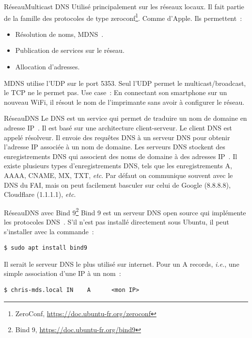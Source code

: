 \documentclass{beamer}
\begin{document}
    \begin{frame}{Réseau}{Multicast DNS}
        Utilisé principalement sur les réseaux locaux.
        Il fait partie de la famille des protocoles de type zeroconf\footnote{ZeroConf, \url{https://doc.ubuntu-fr.org/zeroconf}}.
        Comme  d'Apple.
        Ils permettent~:
        \begin{itemize}
            \item  Résolution de noms, MDNS~.
            \item  Publication de services sur le réseau.
            \item  Allocation d'adresses.
        \end{itemize}
        \bigbreak
        MDNS utilise l'UDP sur le port 5353.
        Seul l'UDP permet le multicast/broadcast, le TCP ne le permet pas.
        \bigbreak
        Use case~: En connectant son smartphone sur un nouveau WiFi, il résout le nom de l'imprimante sans avoir à configurer le réseau.
    \end{frame}

    \begin{frame}{Réseau}{DNS}
        Le DNS est un service qui permet de traduire un nom de domaine en adresse IP~.
        Il est basé sur une architecture client-serveur.
        \bigbreak
        Le client DNS est appelé résolveur.
        Il envoie des requêtes DNS à un serveur DNS pour obtenir l'adresse IP associée à un nom de domaine.
        \bigbreak
        Les serveurs DNS stockent des enregistrements DNS qui associent des noms de domaine à des adresses IP~.
        Il existe plusieurs types d'enregistrements DNS, tels que les enregistrements A, AAAA, CNAME, MX, TXT, \textit{etc}.
        \bigbreak
        Par défaut on communique souvent avec le DNS du FAI, mais on peut facilement basculer sur celui de Google (8.8.8.8), Cloudflare (1.1.1.1), \textit{etc}.
    \end{frame}

    \begin{frame}[fragile]{Réseau}{DNS avec Bind 9\footnote{Bind 9, \url{https://doc.ubuntu-fr.org/bind9}}}
        Bind 9 est un serveur DNS open source qui implémente les protocoles DNS~.
        S'il n'est pas installé directement sous Ubuntu, il peut s'installer avec la commande~:
        \begin{lstlisting}
$ sudo apt install bind9
        \end{lstlisting}
        Il serait le serveur DNS le plus utilisé sur internet.
        \bigbreak
        Pour un A records, \textit{i.e.}, une simple association d'une IP à un nom~:
        \begin{lstlisting}
$ chris-mds.local IN    A      <mon IP>
        \end{lstlisting}
        \bigbreak
    \end{frame}
\end{document}

